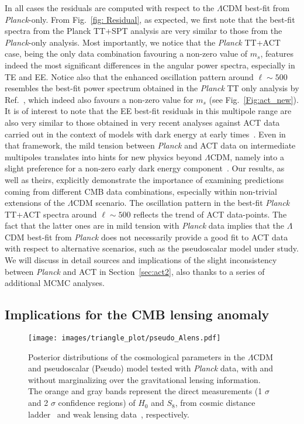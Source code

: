 \documentclass[a4paper,11pt]{article}
\begin{document}
In all cases the residuals are computed with respect to the $\Lambda$CDM best-fit from \emph{Planck}-only.
From Fig.~\ref{fig: Residual}, as expected, we first note that the best-fit spectra from the Planck TT+SPT analysis are very similar to those from the \emph{Planck}-only analysis. 
Most importantly, we notice that the \emph{Planck} TT+ACT case, being the only data combination favouring a non-zero value of $m_s$, features indeed the most significant differences in the angular power spectra, especially in TE and EE.
Notice also that the enhanced oscillation pattern around $ \ell \sim 500$ resembles the best-fit power spectrum obtained in the \emph{Planck} TT only analysis by Ref.~\cite{Archidiacono:2020yey}, which indeed also favours a non-zero value for $m_s$ (see Fig.~\ref{Fig:act_new}).
It is of interest to note that the EE best-fit residuals in this multipole range are also very similar to those obtained in very recent analyses against ACT data carried out in the context of models with dark energy at early times~\cite{Lin:2020jcb,Hill:2021yec,Poulin:2021bjr}.
Even in that framework, the mild tension between \emph{Planck} and ACT data on intermediate multipoles translates into hints for new physics beyond $\Lambda$CDM, namely into a slight preference for a non-zero early dark energy component~\cite{Hill:2021yec,Poulin:2021bjr}. Our results, as well as theirs, explicitly demonstrate the importance of examining predictions coming from different CMB data combinations, especially within non-trivial extensions of the $\Lambda$CDM scenario.
The oscillation pattern in the best-fit \emph{Planck} TT+ACT spectra around $ \ell \sim 500$ reflects the trend of ACT data-points. The fact that the latter ones are in mild tension with \emph{Planck} data implies that the $\Lambda$CDM best-fit from \emph{Planck} does not necessarily provide a good fit to ACT data with respect to alternative scenarios, such as the pseudoscalar model under study.
We will discuss in detail sources and implications of the slight inconsistency between \emph{Planck} and ACT in Section~\ref{sec:act2}, also thanks to a series of additional MCMC analyses.





\subsection{Implications for the CMB lensing anomaly}\label{sec:Planck+Alens}


 \begin{figure}[t]
 \centering
   \texttt{[image: images/triangle\_plot/pseudo\_Alens.pdf]}  
  \caption{ Posterior distributions of the cosmological parameters in the $\Lambda$CDM and pseudoscalar (Pseudo) model tested with \emph{Planck} data, with and without marginalizing over the gravitational lensing information. The orange and gray bands represent the direct measurements (1 $\sigma$ and 2 $\sigma$ confidence regions) of $H_0$ and $S_8$, from cosmic distance ladder~\cite{Riess:2020fzl} and weak lensing data~\cite{Gatti:2021uwl}, respectively.}
  \label{Fig:Pseudo_Alens}
\end{figure}
\end{document}

